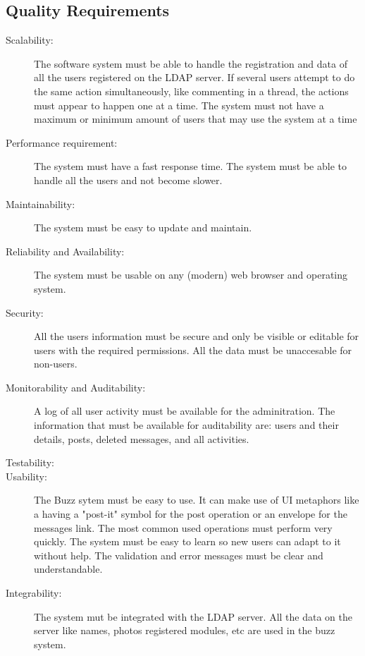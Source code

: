 \documentclass[12pt]{article}
\begin{document}
\subsection{Quality Requirements}
\begin{description}
  \item[Scalability:] 
        The software system must be able to handle the registration and data of all the users registered on the LDAP server. 
       If several users attempt to do the same action simultaneously, like commenting in a thread, the actions must appear to happen one at a time. 
      The system must not have a maximum or minimum amount of users that may use the system at a time
  \item[Performance requirement:]
      The system must have a fast response time. The system must be able to handle all the users and not become slower.
  \item[Maintainability:] 
      The system must be easy to update and maintain.
  \item[Reliability and Availability:]
      The system must be usable on any (modern) web browser and operating system.
  \item[Security:]
      All the users information must be secure and only be visible or editable for users with the required permissions. All the data must be unaccesable for non-users.
  \item[Monitorability and Auditability:]
      A log of all user activity must be available for the adminitration. The information that must be available for auditability are: users and their details, posts, deleted messages, and all activities.
  \item[Testability:]

  \item[Usability:]
      The Buzz sytem must be easy to use. It can make use of UI metaphors like a having a "post-it" symbol for the post operation or an envelope for the messages link.
      The most common used operations must perform very quickly. The system must be easy to learn so new users can adapt to it without help. 
      The validation and error messages must be clear and understandable.
  \item[Integrability:]
      The system mut be integrated with the LDAP server. 
      All the data on the server like names, photos registered modules, etc are used in the buzz system. 
\end{description}
\end{document}
